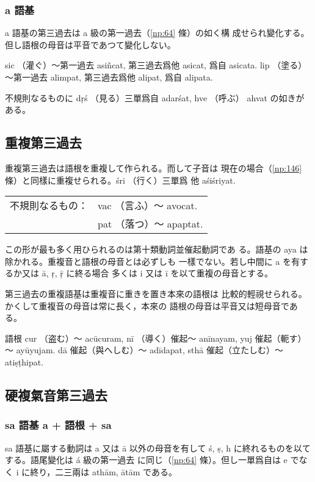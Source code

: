 \subsubsection{a 語基}
\numberParagraph
a 語基の第三過去は a 級の第一過去（\ref{np:64} 條）の如く構
成せられ變化する。但し語根の母音は平音であつて變化しない。

sic （灌ぐ）～第一過去 asiñcat, 第三過去爲他 asicat, 爲自
asicata. lip （塗る）～第一過去 alimpat, 第三過去爲他 alipat,
爲自 alipata.

不規則なるものに dṛś （見る）三單爲自 adarśat, hve （呼ぶ）
ahvat の如きがある。

\subsection{重複第三過去}
\numberParagraph
重複第三過去は語根を重複して作られる。而して子音は
現在の場合（\ref{np:146} 條）と同樣に重複せられる。śri （行く）三單爲
他 aśiśriyat.

\begin{tabular}{ll}
不規則なるもの： & vac （言ふ）～ avocat. \\
                 & pat （落つ）～ apaptat.
\end{tabular}

この形が最も多く用ひられるのは第十類動詞並催起動詞であ
る。語基の aya は除かれる。重複音と語根の母音とは必ずしも
一樣でない。若し中間に a を有するか又は ā, ṛ, ṝ に終る場合
多くは i 又は ī を以て重複の母音とする。

\numberParagraph
第三過去の重複語基は重複音に重きを置き本來の語根は
比較的輕視せられる。かくして重複音の母音は常に長く，本來の
語根の母音は平音又は短母音である。

語根 cur （盗む）～ acūcuram, nī （導く）催起～ anīnayam,
yuj 催起（軛す）～ ayūyujam. dā 催起（與へしむ）～ adīdapat,
sthā 催起（立たしむ）～ atiṣṭhipat.

\subsection{硬複氣音第三過去}
\subsubsection{sa 語基 a + 語根 + sa}
\numberParagraph
sa 語基に屬する動詞は a 又は ā 以外の母音を有して
ś, ṣ, h に終れるものを以てする。語尾變化は á 級の第一過去
に同じ（\ref{np:64} 條）。但し一單爲自は e でなく i に終り，二三兩は
athām, ātām である。

